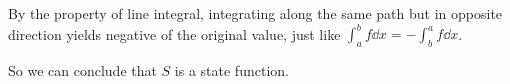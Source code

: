 \documentclass[class=article, crop=false, 12pt]{standalone}
\begin{document}
\begin{enumerate}

    By the property of line integral,
    integrating along the same path but in opposite direction yields negative of the original value,
    just like $\int_a^b f \dd{x} = -\int_b^a f \dd{x}$.


    So we can conclude that $S$ is a state function.

\end{enumerate}
\end{document}
